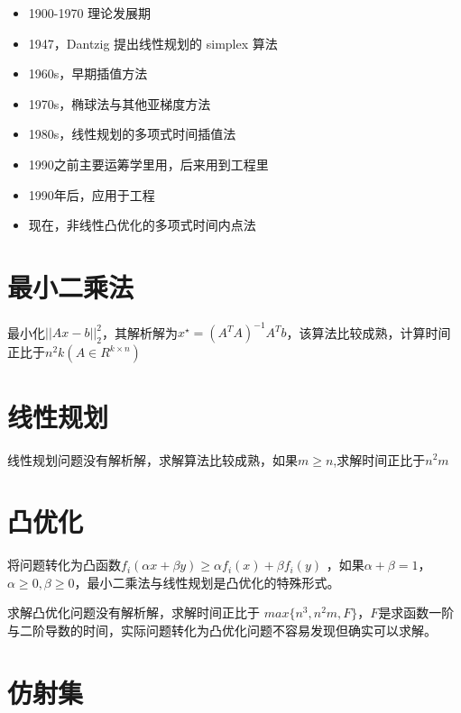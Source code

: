 \documentclass[
]{book}
\begin{document}
\begin{itemize}
\item
  1900-1970 理论发展期
\item
  1947，Dantzig 提出线性规划的 simplex 算法
\item
  1960s，早期插值方法
\item
  1970s，椭球法与其他亚梯度方法
\item
  1980s，线性规划的多项式时间插值法
\item
  1990之前主要运筹学里用，后来用到工程里
\item
  1990年后，应用于工程
\item
  现在，非线性凸优化的多项式时间内点法
\end{itemize}

\hypertarget{ux6700ux5c0fux4e8cux4e58ux6cd5}{%
\section{最小二乘法}\label{ux6700ux5c0fux4e8cux4e58ux6cd5}}

最小化\(||Ax-b||_2^2\)，其解析解为\(x^\star = (A^TA)^{-1}A^Tb\)，该算法比较成熟，计算时间正比于\(n^2k(A\in R^{k\times n})\)

\hypertarget{ux7ebfux6027ux89c4ux5212}{%
\section{线性规划}\label{ux7ebfux6027ux89c4ux5212}}

线性规划问题没有解析解，求解算法比较成熟，如果\(m\geq n\),求解时间正比于\(n^2m\)

\hypertarget{ux51f8ux4f18ux5316}{%
\section{凸优化}\label{ux51f8ux4f18ux5316}}

将问题转化为凸函数\(f_i(\alpha x+\beta y)\geq \alpha f_i(x)+\beta f_i(y)\) ，如果\(\alpha + \beta = 1\)，\(\alpha \geq 0, \beta\geq 0\)，最小二乘法与线性规划是凸优化的特殊形式。

求解凸优化问题没有解析解，求解时间正比于 \(max\{ n^3,n^2m,F\}\)，\(F\)是求函数一阶与二阶导数的时间，实际问题转化为凸优化问题不容易发现但确实可以求解。

\hypertarget{ux4effux5c04ux96c6}{%
\section{仿射集}\label{ux4effux5c04ux96c6}}
\end{document}
